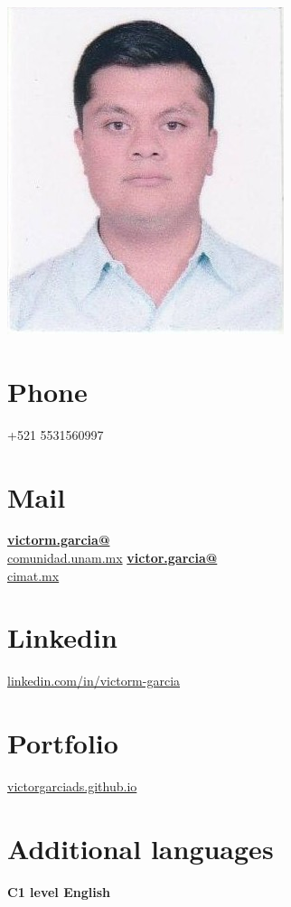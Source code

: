 \documentclass[]{friggeri-cv}
\begin{document}
\begin{aside}
  \includegraphics[scale=0.268]{img/foto2.png}
  \section{Phone}
    +521 5531560997
  \section{Mail}
    \href{mailto:victorm.garcia@comunidad.unam.mx}{\textbf{victorm.garcia@}\\comunidad.unam.mx}
    \href{mailto:victor.garcia@cimat.mx}{\textbf{victor.garcia@}\\cimat.mx}
    \section{Linkedin}
    \url{linkedin.com/in/victorm-garcia}%
    \section{Portfolio}
    \url{victorgarciads.github.io}%
     \section{Additional languages}
    \textbf{C1 level English}

\end{aside}
\end{document}
